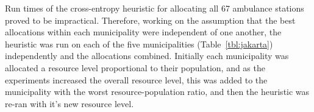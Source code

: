 \documentclass[preprint,12pt]{elsarticle}
\begin{document}
Run times of the cross-entropy heuristic for allocating all 67 ambulance
stations proved to be impractical. Therefore, working on the assumption that the
best allocations within each municipality were independent of one another, the
heuristic was run on each of the five municipalities (Table~\ref{tbl:jakarta})
independently and the allocations combined. Initially each municipality was
allocated a resource level proportional to their population, and as the
experiments increased the overall resource level, this was added to the
municipality with the worst resource-population ratio, and then the heuristic
was re-ran with it's new resource level.


\end{document}
